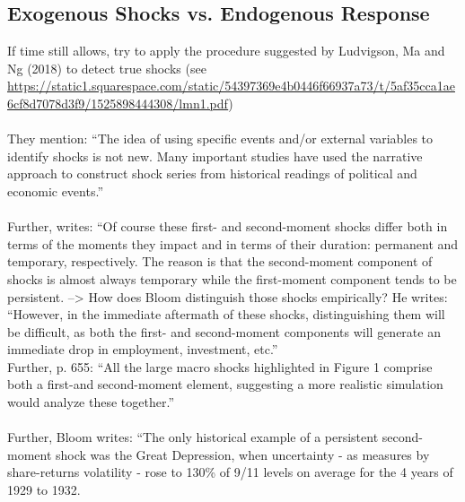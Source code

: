 \documentclass[a4paper,11pt,listof=nochaptergap,oneside,pointednumbers,bibtotoc,bigheadings,liststotoc]{scrbook}
\begin{document}
\subsection{Exogenous Shocks vs. Endogenous Response}
\label{sec:exoEndoJuradoetal}
If time still allows, try to apply the procedure suggested by Ludvigson, Ma and Ng (2018) to detect true shocks (see \url{https://static1.squarespace.com/static/54397369e4b0446f66937a73/t/5af35cca1ae6cf8d7078d3f9/1525898444308/lmn1.pdf})
\\\\
They mention: ``The idea of using specific events and/or external variables to identify shocks is not new. Many important studies have used the narrative approach to construct shock series from historical readings of political and economic events.''
\\
\\
Further, \citet[p. 657]{bloom:09} writes: ``Of course these first- and second-moment shocks differ both in terms of the moments they impact and in terms of their duration: permanent and temporary, respectively. The reason is that the second-moment component of shocks is almost always temporary while the first-moment component tends to be persistent. --> How does Bloom distinguish those shocks empirically? He writes: ``However, in the immediate aftermath of these shocks, distinguishing them will be difficult, as both the first- and second-moment components will generate an immediate drop in employment, investment, etc.'' \\
Further, p. 655: ``All the large macro shocks highlighted in Figure 1 comprise both a first-and second-moment element, suggesting a more realistic simulation would analyze these together.''\\
\\
Further, Bloom writes: ``The only historical example of a persistent second-moment shock was the Great Depression, when uncertainty - as measures by share-returns volatility - rose to 130\% of 9/11 levels on average for the 4 years of 1929 to 1932. 

\end{document}

